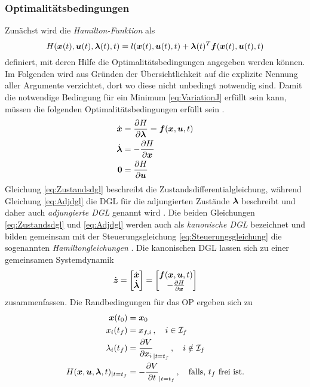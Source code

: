 \subsubsection{Optimalitätsbedingungen}\label{subsubsec:Optimalitätsbedingungen}
Zunächst wird die \textit{Hamilton-Funktion} als 
\begin{equation}
	H(\boldsymbol{x}(t),\boldsymbol{u}(t),\boldsymbol{\lambda}(t),t) = l(\boldsymbol{x}(t),\boldsymbol{u}(t),t) + \boldsymbol{\lambda}(t)^T\boldsymbol{f}(\boldsymbol{x}(t),\boldsymbol{u}(t),t) \label{eq:Hamilton}
\end{equation}
definiert, mit deren Hilfe die Optimalitätsbedingungen angegeben werden können. Im Folgenden wird aus Gründen der Übersichtlichkeit auf die explizite Nennung aller Argumente verzichtet, dort wo diese nicht unbedingt notwendig sind. Damit die notwendige Bedingung für ein Minimum \eqref{eq:VariationJ} erfüllt sein kann, müssen die folgenden Optimalitätsbedingungen erfüllt sein \cite{KnutGraichen.2012}.
\begin{align}
	\dot{\boldsymbol{x}} &= \frac{\partial H}{\partial\boldsymbol{\lambda}} = \boldsymbol{f}(\boldsymbol{x},\boldsymbol{u},t) \label{eq:Zustandsdgl} \\
	\dot{\boldsymbol{\lambda}} &= -\frac{\partial H}{\partial \boldsymbol{x}} \label{eq:Adjdgl} \\
	\boldsymbol{0} &= \frac{\partial H}{\partial \boldsymbol{u}} \label{eq:Steuerungsgleichung} 
\end{align}
Gleichung \eqref{eq:Zustandsdgl} beschreibt die Zustandsdifferentialgleichung, während Gleichung \eqref{eq:Adjdgl} die \gls{DGL} für die adjungierten Zustände $\boldsymbol{\lambda}$ beschreibt und daher auch \textit{adjungierte \gls{DGL}} genannt wird \cite{Konigorski.2019}. Die beiden Gleichungen \eqref{eq:Zustandsdgl} und \eqref{eq:Adjdgl} werden auch als \textit{kanonische \gls{DGL}} bezeichnet und bilden gemeinsam mit der Steuerungsgleichung \eqref{eq:Steuerungsgleichung} die sogenannten \textit{Hamiltongleichungen} \cite{Konigorski.2019}. Die kanonischen \gls{DGL} lassen sich zu einer gemeinsamen Systemdynamik 
\begin{equation}
	\dot{\boldsymbol{z}} = \begin{bmatrix}
	\dot{\boldsymbol{x}} \\
	\dot{\boldsymbol{\lambda}}
	\end{bmatrix} = 
	\begin{bmatrix}
	\boldsymbol{f}(\boldsymbol{x},\boldsymbol{u},t) \\
	-\frac{\partial H}{\partial \boldsymbol{x}}
	\end{bmatrix} \label{eq:Sysdyn_z}
\end{equation}
zusammenfassen.
Die Randbedingungen für das \gls{OP} ergeben sich zu \cite{KnutGraichen.2012}
\begin{align}
\boldsymbol{x}(t_0) &= \boldsymbol{x}_0 \label{eq:Anfangswerte} \\
x_i(t_f) &= x_{f,i}\,, \quad i \in\mathcal{I}_f \label{eq:Endwerte} \\
\lambda_i(t_f) &= \frac{\partial V}{\partial x_i}_{|t=t_f}\,, \quad i \notin \mathcal{I}_f \label{eq:Lambdaend} \\
H(\boldsymbol{x},\boldsymbol{u},\boldsymbol{\lambda},t)_{|t=t_f} &= -\frac{\partial V}{\partial t}_{|t=t_f}\,,\quad \textrm{falls, $t_f$ frei ist.} \label{eq:Transversalitaet}
\end{align}
